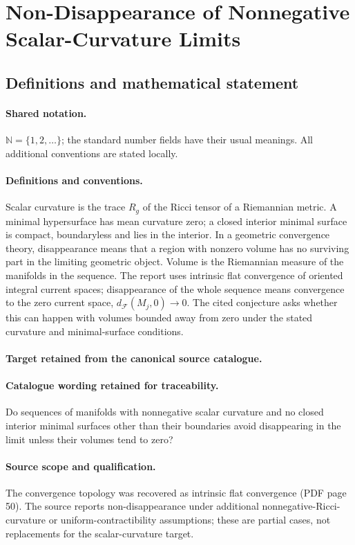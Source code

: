 \documentclass[11pt]{article}
\begin{document}
\section{Non-Disappearance of Nonnegative Scalar-Curvature Limits}\label{statement}

\subsection{Definitions and mathematical statement}

\paragraph{Shared notation.}$\mathbb N=\{1,2,\ldots\}$; the standard number fields have their usual meanings. All additional conventions are stated locally.


\paragraph{Definitions and conventions.}
Scalar curvature is the trace $R_g$ of the Ricci tensor of a Riemannian metric. A minimal hypersurface has mean curvature zero; a closed interior minimal surface is compact, boundaryless and lies in the interior. In a geometric convergence theory, disappearance means that a region with nonzero volume has no surviving part in the limiting geometric object. Volume is the Riemannian measure of the manifolds in the sequence. The report uses intrinsic flat convergence of oriented integral current spaces; disappearance of the whole sequence means convergence to the zero current space, $d_{\mathcal F}(M_j,0)\to0$. The cited conjecture asks whether this can happen with volumes bounded away from zero under the stated curvature and minimal-surface conditions.

\paragraph{Target retained from the canonical source catalogue.}
\paragraph{Catalogue wording retained for traceability.}
Do sequences of manifolds with nonnegative scalar curvature and no closed interior minimal surfaces other than their boundaries avoid disappearing in the limit unless their volumes tend to zero?

\paragraph{Source scope and qualification.}
The convergence topology was recovered as intrinsic flat convergence (PDF page 50). The source reports non-disappearance under additional nonnegative-Ricci-curvature or uniform-contractibility assumptions; these are partial cases, not replacements for the scalar-curvature target.
\end{document}
